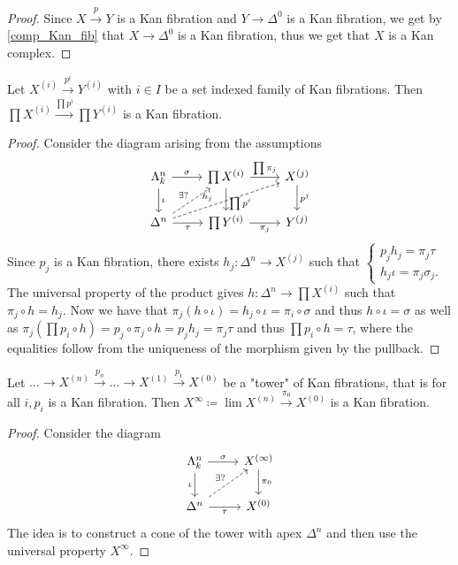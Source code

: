 \begin{proof}
    Since $X \xrightarrow{p} Y$ is a Kan fibration and $Y \to \Delta^0$ is a Kan fibration, we get by \cref{comp_Kan_fib} that $X \to \Delta^0$ is a Kan fibration, thus we get that $X$ is a Kan complex.
\end{proof}

\begin{prop}
    Let $X^{(i)} \xrightarrow{p^i} Y^{(i)}$ with $i \in I$ be a set indexed family of Kan fibrations.
    Then $\prod X^{(i)} \xrightarrow{\prod p^i} \prod Y^{(i)}$ is a Kan fibration.
\end{prop}

\begin{proof}
Consider the diagram arising from the assumptions
\[
    \begin{tikzcd}
        \Lambda_k^n
        \ar[r,"\sigma"]
        \ar[d,"\iota"]
        &
        \prod X^{(i)}
        \ar[d, "\prod p^i" pos=0.7]
        \ar[r, "\prod \pi_j"]
        &
        X^{(j)}
        \ar[d, "p^j"]
        \\
        \Delta^n
        \ar[ru, dashed, "\exists ?"]
        \ar[rru, dashed, "h_j" pos=0.4]
        \ar[r, "\tau"']
        &
        \prod Y^{(i)}
        \ar[r, "\pi_j"']
        &
        Y^{(j)}
    \end{tikzcd}
\]
Since $p_j$ is a Kan fibration, there exists $h_j \colon \Delta^n \to X^{(j)}$ such that 
$\begin{cases}
    p_jh_j=\pi_j\tau\\
    h_j\iota = \pi_j \sigma_j.
\end{cases}$
    The universal property of the product gives $h \colon \Delta^n \to \prod X^{(i)}$ such that $\pi_j \circ h = h_j$.
    Now we have that $\pi_j(h \circ \iota ) = h_j \circ \iota = \pi_i \circ \sigma$ and thus $h \circ \iota = \sigma$ as well as $\pi_j(\prod {p_i} \circ h) = p_j \circ \pi_j \circ h = p_j h_j = \pi_j \tau$ and thus $\prod p_i \circ h = \tau$, where the equalities follow from the uniqueness of the morphism given by the pullback.
\end{proof}

\begin{prop}
    Let $\dotsc \to X^{(n)} \xrightarrow{p_n} \dotsc \to X^{(1)} \xrightarrow{p_1}X^{(0)}$ be a "tower" of Kan fibrations, that is for all $i, p_i$ is a Kan fibration.
    Then $X^{\infty} \coloneqq \lim X^{(n)} \xrightarrow{\pi_0} X^{(0)}$ is a Kan fibration. 
\end{prop}

\begin{proof}
    Consider the diagram 
\[
\begin{tikzcd}
    \Lambda_k^n
    \arrow[d,"\iota"']
    \ar[r, "\sigma"]
    &
    X^{(\infty)}
    \ar[d,"\pi_0"]
    \\
    \Delta^n
    \ar[ru, dashed, "\exists ?"]
    \ar[r,"\tau"']
    &
    X^{(0)}
\end{tikzcd}
\]
The idea is to construct a cone of the tower with apex $\Delta^n$ and then use the universal property $X^\infty$.
\end{proof}